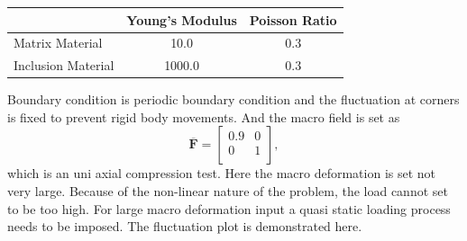 \begin{center}
\begin{tabular}{l|c|c}
\hline
& Young's Modulus & Poisson Ratio \\
\hline
Matrix Material & 10.0 & 0.3 \\
Inclusion Material & 1000.0 & 0.3 \\
\hline
\end{tabular}
\end{center}
Boundary condition is periodic boundary condition and the fluctuation at corners is fixed to prevent rigid body movements. And the macro field is set as 
\[
\overbar{\mathbf{F}} = 
\begin{bmatrix}
0.9 & 0 \\
0 & 1 \\
\end{bmatrix},
\]
which is an uni axial compression test. Here the macro deformation is set not very large. Because of the non-linear nature of the problem, the load cannot set to be too high. For large macro deformation input a quasi static loading process needs to be imposed. The fluctuation plot is demonstrated here.

